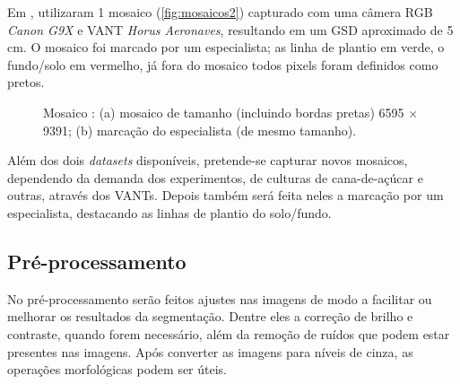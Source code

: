 \documentclass[12pt, a4paper, english, brazil]{article}
\begin{document}
Em , utilizaram 1 mosaico \cite{CropRowsDataset2019} (\autoref{fig:mosaicos2}) capturado com uma câmera RGB \textit{Canon G9X} e VANT \textit{Horus Aeronaves}, resultando em um GSD aproximado de 5 cm. O mosaico foi marcado por um especialista; as linha de plantio em verde, o fundo/solo em vermelho, já fora do mosaico todos pixels foram definidos como pretos.

\begin{figure}[htbp]
    \centering
    \caption{Mosaico : (a) mosaico de tamanho (incluindo bordas pretas) 6595 $\times$ 9391; (b) marcação do especialista (de mesmo tamanho).}
    \label{fig:mosaicos2}
\end{figure}

Além dos dois \textit{datasets} disponíveis, pretende-se capturar novos mosaicos, dependendo da demanda dos experimentos, de culturas de cana-de-açúcar e outras, através dos VANTs. Depois também será feita neles a marcação por um especialista, destacando as linhas de plantio do solo/fundo.

\subsection{Pré-processamento}

No pré-processamento serão feitos ajustes nas imagens de modo a facilitar ou melhorar os resultados da segmentação. Dentre eles a correção de brilho e contraste, quando forem necessário, além da remoção de ruídos que podem estar presentes nas imagens. Após converter as imagens para níveis de cinza, as operações morfológicas podem ser úteis.
\end{document}
